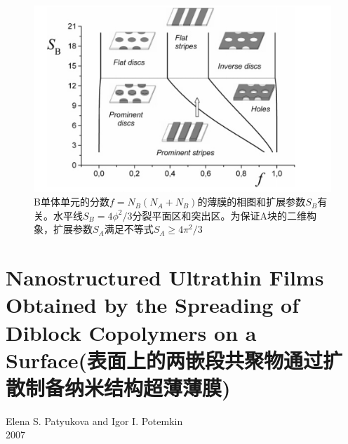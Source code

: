 \documentclass[12pt,a4paper]{article}
\numberwithin{equation}{section}
\begin{document}
\begin{figure}[H]
\centering
\includegraphics[scale=0.5]{./figures/14.png}
\caption{B单体单元的分数$f=N_B(N_A+N_B)$的薄膜的相图和扩展参数$S_B$有关。水平线$S_B=4\phi^2/3$分裂平面区和突出区。为保证A块的二维构象，扩展参数$S_A$满足不等式$S_A \geq 4\pi^2/3$}
\end{figure}

\section{Nanostructured Ultrathin Films Obtained by the Spreading of Diblock Copolymers on a Surface(表面上的两嵌段共聚物通过扩散制备纳米结构超薄薄膜)}
\begin{center}
Elena S. Patyukova  and Igor I. Potemkin\\
2007
\end{center}
\end{document}
